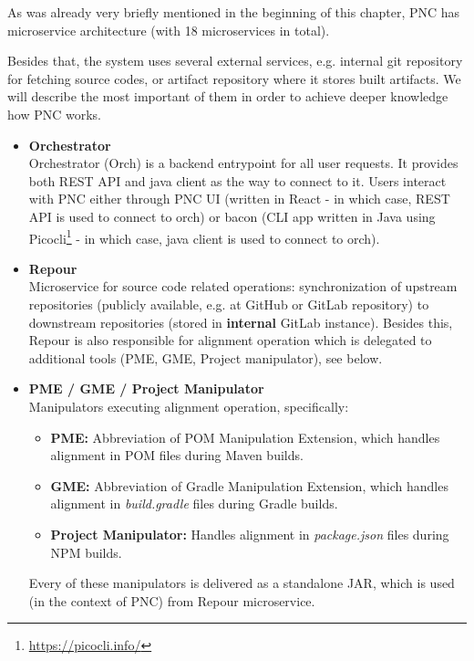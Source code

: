 \documentclass[../main.tex]{subfiles}
\begin{document}
As was already very briefly mentioned in the beginning of this chapter, PNC has microservice architecture (with 18 microservices in total).

Besides that, the system uses several external services, e.g. internal git repository for fetching source codes, or artifact repository where it stores built artifacts. We will describe the most important of them in order to achieve deeper knowledge how PNC works.

\begin{itemize}
    \item \textbf{Orchestrator}\\
    Orchestrator (Orch) is a backend entrypoint for all user requests. It provides both REST API and java client as the way to connect to it. Users interact with PNC either through PNC UI (written in React - in which case, REST API is used to connect to orch) or bacon (CLI app written in Java using Picocli\footnote{\url{https://picocli.info/}} - in which case, java client is used to connect to orch).

    \item \textbf{Repour}\\
    Microservice for source code related operations: synchronization of upstream repositories (publicly available, e.g. at GitHub or GitLab repository) to downstream repositories (stored in \textbf{internal} GitLab instance). Besides this, Repour is also responsible for alignment operation which is delegated to additional tools (PME, GME, Project manipulator), see below.

    \item \textbf{PME / GME / Project Manipulator}\\
    Manipulators executing alignment operation, specifically:
    \begin{itemize}
        \item \textbf{PME:} Abbreviation of POM Manipulation Extension, which handles alignment in POM files during Maven builds.

        \item \textbf{GME:} Abbreviation of Gradle Manipulation Extension, which handles alignment in \textit{build.gradle} files during Gradle builds.

        \item \textbf{Project Manipulator:} Handles alignment in \textit{package.json} files during NPM builds.
    \end{itemize}

    Every of these manipulators is delivered as a standalone JAR, which is used (in the context of PNC) from Repour microservice.


\end{itemize}
\end{document}
